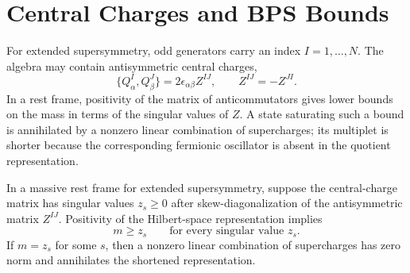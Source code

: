 \section{Central Charges and BPS Bounds}

For extended supersymmetry, odd generators carry an index \(I=1,\ldots,N\).
The algebra may contain antisymmetric central charges,
\[
  \{Q^I_\alpha,Q^J_\beta\}
  =
  2\epsilon_{\alpha\beta}Z^{IJ},
  \qquad Z^{IJ}=-Z^{JI}.
\]
In a rest frame, positivity of the matrix of anticommutators gives lower
bounds on the mass in terms of the singular values of \(Z\).  A state
saturating such a bound is annihilated by a nonzero linear combination of
supercharges; its multiplet is shorter because the corresponding fermionic
oscillator is absent in the quotient representation.

\begin{proposition}
\label{prop:bps-bound-singular-values}
In a massive rest frame for extended supersymmetry, suppose the central-charge
matrix has singular values \(z_s\ge0\) after skew-diagonalization of the
antisymmetric matrix \(Z^{IJ}\).  Positivity of the Hilbert-space
representation implies
\[
  m\ge z_s
  \qquad\text{for every singular value }z_s .
\]
If \(m=z_s\) for some \(s\), then a nonzero linear combination of
supercharges has zero norm and annihilates the shortened representation.
\end{proposition}


